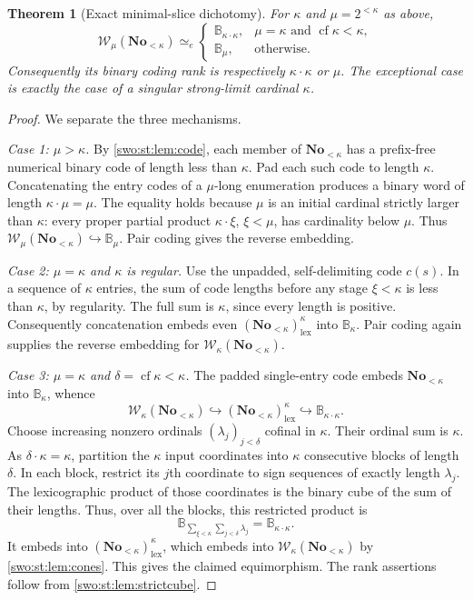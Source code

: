 \documentclass[11pt]{article}
\newtheorem{theorem}{Theorem}[section]
\theoremstyle{definition}
\theoremstyle{remark}
\newcommand{\No}{\mathbf{No}}
\newcommand{\WO}{\mathcal W}
\newcommand{\BB}{\mathbb B}
\newcommand{\lex}{\mathrm{lex}}
\newcommand{\cf}{\operatorname{cf}}
\newcommand{\emb}{\hookrightarrow}
\newcommand{\equim}{\mathrel{\simeq_{\!e}}}
\begin{document}
\begin{theorem}[Exact minimal-slice dichotomy]\label{swo:st:thm:transition}
For $\kappa$ and $\mu=2^{<\kappa}$ as above,
\[
 \WO_\mu(\No_{<\kappa})\equim
 \begin{cases}
 \BB_{\kappa\cdot\kappa},
    &\mu=\kappa\text{ and }\cf\kappa<\kappa,\\[2pt]
 \BB_\mu,&\text{otherwise}.
 \end{cases}
\]
Consequently its binary coding rank is respectively
$\kappa\cdot\kappa$ or $\mu$. The exceptional case is exactly the case
of a singular strong-limit cardinal $\kappa$.
\end{theorem}
\begin{proof}
We separate the three mechanisms.

\emph{Case 1: $\mu>\kappa$.} By \cref{swo:st:lem:code}, each member of
$\No_{<\kappa}$ has a prefix-free numerical binary code of length less than
$\kappa$. Pad each such code to length $\kappa$. Concatenating the entry
codes of a $\mu$-long enumeration produces a binary word of length
$\kappa\cdot\mu=\mu$. The equality holds because $\mu$ is an initial
cardinal strictly larger than $\kappa$: every proper partial product
$\kappa\cdot\xi$, $\xi<\mu$, has cardinality below $\mu$.
Thus $\WO_\mu(\No_{<\kappa})\emb\BB_\mu$. Pair coding gives the reverse
embedding.

\emph{Case 2: $\mu=\kappa$ and $\kappa$ is regular.} Use the unpadded,
self-delimiting code $c(s)$. In a sequence of $\kappa$ entries, the sum
of code lengths before any stage $\xi<\kappa$ is less than $\kappa$,
by regularity. The full sum is $\kappa$, since every length is positive.
Consequently concatenation embeds even
$(\No_{<\kappa})^\kappa_{\lex}$ into $\BB_\kappa$. Pair coding again supplies
the reverse embedding for $\WO_\kappa(\No_{<\kappa})$.

\emph{Case 3: $\mu=\kappa$ and $\delta=\cf\kappa<\kappa$.}
The padded single-entry code embeds $\No_{<\kappa}$ into $\BB_\kappa$,
whence
\[
 \WO_\kappa(\No_{<\kappa})\emb
 (\No_{<\kappa})^\kappa_{\lex}\emb\BB_{\kappa\cdot\kappa}.
\]
Choose increasing nonzero ordinals $(\lambda_j)_{j<\delta}$ cofinal in
$\kappa$. Their ordinal sum is $\kappa$. As $\delta\cdot\kappa=\kappa$,
partition the $\kappa$ input coordinates into $\kappa$ consecutive blocks
of length $\delta$. In each block, restrict its $j$th coordinate to sign
sequences of exactly length $\lambda_j$. The lexicographic product of
those coordinates is the binary cube of the sum of their lengths.
Thus, over all the blocks, this restricted product is
\[
 \BB_{\sum_{\xi<\kappa}\sum_{j<\delta}\lambda_j}
   =\BB_{\kappa\cdot\kappa}.
\]
It embeds into $(\No_{<\kappa})^\kappa_{\lex}$, which embeds into
$\WO_\kappa(\No_{<\kappa})$ by \cref{swo:st:lem:cones}. This gives the claimed
equimorphism. The rank assertions follow from \cref{swo:st:lem:strictcube}.


\end{proof}
\end{document}
